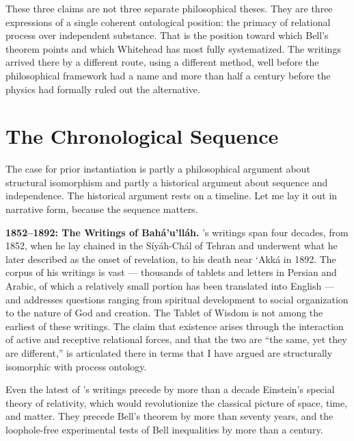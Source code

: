 These three claims are not three separate philosophical theses.
They are three expressions of a single coherent ontological position: the primacy
of relational process over independent substance.
That is the position toward which Bell's theorem points and which
Whitehead has most fully systematized.
The \bahai writings arrived there by a different route, using a different method,
well before the philosophical framework had a name and more than half a century
before the physics had formally ruled out the alternative.


\section{The Chronological Sequence}
\label{sec:ch6-chronology}

The case for prior instantiation is partly a philosophical argument about
structural isomorphism and partly a historical argument about sequence and
independence.
The historical argument rests on a timeline.
Let me lay it out in narrative form, because the sequence matters.

\textbf{1852--1892: The Writings of Bahá'u'lláh.}
\Bahaullah's writings span four decades, from 1852, when he lay chained in the
Síyáh-Chál of Tehran and underwent what he later described as the onset of
revelation, to his death near `Akká in 1892.
The corpus of his writings is vast --- thousands of tablets and letters in Persian
and Arabic, of which a relatively small portion has been translated into
English --- and addresses questions ranging from spiritual development to social
organization to the nature of God and creation.
The Tablet of Wisdom is not among the earliest of these writings.
The claim that existence arises through the interaction of active and receptive
relational forces, and that the two are ``the same, yet they are different,'' is
articulated there in terms that I have argued are structurally isomorphic with
process ontology.

Even the latest of \Bahaullah's writings precede by more than a decade Einstein's
special theory of relativity, which would revolutionize the classical picture of
space, time, and matter.
They precede Bell's theorem by more than seventy years, and the loophole-free
experimental tests of Bell inequalities by more than a century.

